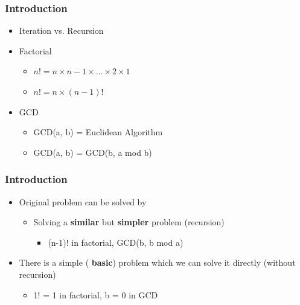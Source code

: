 \documentclass{../c-lecture}
\begin{document}
\begin{frame}
  \frametitle{Introduction}
  \begin{itemize}
    \item Iteration vs. Recursion
    \item Factorial
    \begin{itemize}
      \item $n! = n \times n-1 \times \ldots \times 2 \times 1$
      \item $n! = n \times (n-1)!$
    \end{itemize}
    \item GCD
    \begin{itemize}
      \item GCD(a, b) = Euclidean Algorithm
      \item GCD(a, b) = GCD(b, a mod b)
    \end{itemize}
  \end{itemize}
\end{frame}

\begin{frame}
  \frametitle{Introduction}
  \begin{itemize}
    \item Original problem can be solved by
    \begin{itemize}
      \item
        Solving a \textbf{\color{Orange} similar} but
        \textbf{\color{LimeGreen} simpler} problem (recursion)
      \begin{itemize}
        \item (n-1)! in factorial, GCD(b, b mod a)
      \end{itemize}
    \end{itemize}
    \item
      There is a simple (\textbf{\color{RubineRed} basic}) problem which we can
      solve it directly (without recursion)
    \begin{itemize}
      \item 1! = 1 in factorial, b = 0 in GCD
    \end{itemize}
  \end{itemize}
\end{frame}
\end{document}
